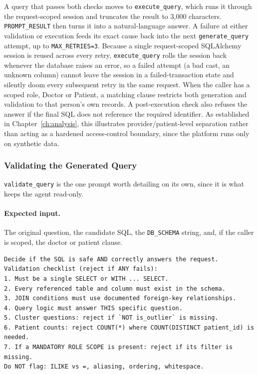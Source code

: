 A query that passes both checks moves to \texttt{execute\_query}, which runs it through the request-scoped session and truncates the result to 3{,}000 characters. \texttt{PROMPT\_RESULT} then turns it into a natural-language answer. A failure at either validation or execution feeds its exact cause back into the next \texttt{generate\_query} attempt, up to \texttt{MAX\_RETRIES=3}. Because a single request-scoped SQLAlchemy session is reused across every retry, \texttt{execute\_query} rolls the session back whenever the database raises an error, so a failed attempt (a bad cast, an unknown column) cannot leave the session in a failed-transaction state and silently doom every subsequent retry in the same request. When the caller has a scoped role, Doctor or Patient, a matching clause restricts both generation and validation to that person's own records. A post-execution check also refuses the answer if the final SQL does not reference the required identifier. As established in Chapter~\ref{ch:analysis}, this illustrates provider/patient-level separation rather than acting as a hardened access-control boundary, since the platform runs only on synthetic data.

\subsubsection*{Validating the Generated Query}

\texttt{validate\_query} is the one prompt worth detailing on its own, since it is what keeps the agent read-only.

\paragraph{Expected input.} The original question, the candidate SQL, the \texttt{DB\_SCHEMA} string, and, if the caller is scoped, the doctor or patient clause.

\vspace{0.25cm}

\begin{lstlisting}[style=pythonstyle]
Decide if the SQL is safe AND correctly answers the request.
Validation checklist (reject if ANY fails):
1. Must be a single SELECT or WITH ... SELECT.
2. Every referenced table and column must exist in the schema.
3. JOIN conditions must use documented foreign-key relationships.
4. Query logic must answer THIS specific question.
5. Cluster questions: reject if `NOT is_outlier` is missing.
6. Patient counts: reject COUNT(*) where COUNT(DISTINCT patient_id) is needed.
7. If a MANDATORY ROLE SCOPE is present: reject if its filter is missing.
Do NOT flag: ILIKE vs =, aliasing, ordering, whitespace.
\end{lstlisting}

